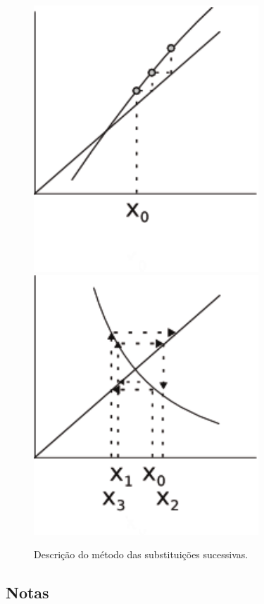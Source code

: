 \begin{figure}[htb]
  \includegraphics[scale=0.9]{capitulos/capitulo1/figuras/substituicoes3-eps-converted-to.pdf}
  \includegraphics[scale=0.9]{capitulos/capitulo1/figuras/substituicoes4-eps-converted-to.pdf}

  \caption{Descrição do método das substituições sucessivas.}
  \label{fig:substituicoes1}  
\end{figure}

\subsection{Notas}

